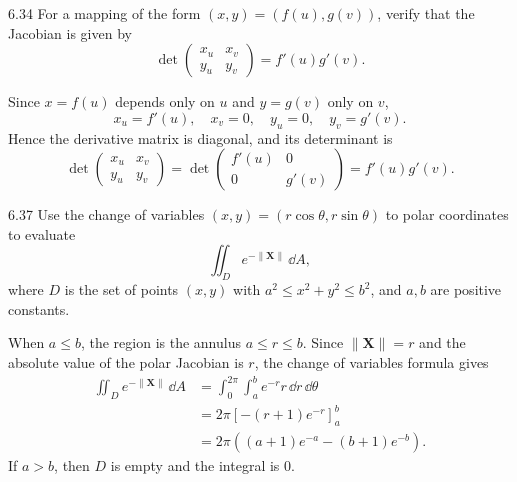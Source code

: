 \documentclass[11pt,oneside]{article}
\begin{document}
\begin{problem}{6.34}
For a mapping of the form $(x, y)=(f(u), g(v))$, verify that the
Jacobian is given by
\[
    \det\begin{pmatrix}x_u&x_v\\y_u&y_v\end{pmatrix}
    =f'(u)g'(v).
\]
\end{problem}
\begin{solution}
Since $x=f(u)$ depends only on $u$ and $y=g(v)$ only on $v$,
\[
    x_u=f'(u), \quad x_v=0, \quad y_u=0, \quad y_v=g'(v).
\]
Hence the derivative matrix is diagonal, and its determinant is
\[
    \boxed{\det\begin{pmatrix}x_u&x_v\\y_u&y_v\end{pmatrix}
      =\det\begin{pmatrix}f'(u)&0\\0&g'(v)\end{pmatrix}
      =f'(u)g'(v)}.
\]
\end{solution}

\begin{problem}{6.37}
Use the change of variables $(x, y)=(r\cos\theta, r\sin\theta)$
to polar coordinates to evaluate
\[
    \iint_D e^{-\|\mathbf X\|}\,\dd A,
\]
where $D$ is the set of points $(x, y)$ with
$a^2\le x^2+y^2\le b^2$, and $a, b$ are positive constants.
\end{problem}
\begin{solution}
When $a\le b$, the region is the annulus $a\le r\le b$.
Since $\|\mathbf X\|=r$ and the absolute value of the polar
Jacobian is $r$, the change of variables formula gives
\[
\begin{aligned}
    \iint_D e^{-\|\mathbf X\|}\,\dd A
    &=\int_0^{2\pi}\int_a^b e^{-r}r\,\dd r\,\dd\theta\\
    &=2\pi\left[-(r+1)e^{-r}\right]_a^b\\
    &=\boxed{2\pi\left((a+1)e^{-a}-(b+1)e^{-b}\right)}.
\end{aligned}
\]
If $a>b$, then $D$ is empty and the integral is $0$.
\end{solution}
\end{document}

